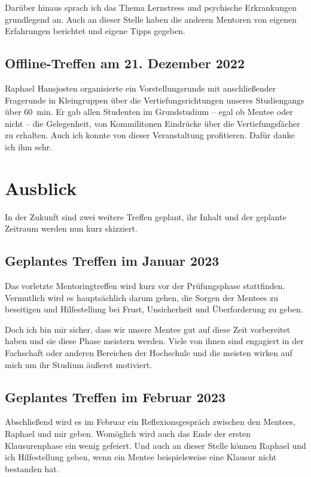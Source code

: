 \documentclass[
    paper=a4,
    div=calc,
    numbers=noendperiod,
]{scrartcl}
\begin{document}
        Darüber hinaus sprach ich das Thema Lernstress und psychische Erkrankungen grundlegend an. Auch an dieser Stelle haben die anderen Mentoren von eigenen Erfahrungen berichtet und eigene Tipps gegeben.

    \subsection{Offline-Treffen am 21. Dezember 2022}
        Raphael Hansjosten organisierte ein Vorstellungsrunde mit anschließender Fragerunde in Kleingruppen über die Vertiefungsrichtungen unseres Studiengangs über \SI{60}{min}. Er gab allen Studenten im Grundstudium -- egal ob Mentee oder nicht -- die Gelegenheit, von Kommilitonen Eindrücke über die Vertiefungsfächer zu erhalten. Auch ich konnte von dieser Veranstaltung profitieren. Dafür danke ich ihm sehr.

\section{Ausblick}
    In der Zukunft sind zwei weitere Treffen geplant, ihr Inhalt und der geplante Zeitraum werden nun kurz skizziert.

    \subsection{Geplantes Treffen im Januar 2023}
        Das vorletzte Mentoringtreffen wird kurz vor der Prüfungsphase stattfinden. Vermutlich wird es hauptsächlich darum gehen, die Sorgen der Mentees zu beseitigen und Hilfestellung bei Frust, Unsicherheit und Überforderung zu geben. 
        
        Doch ich bin mir sicher, dass wir unsere Mentee gut auf diese Zeit vorbereitet haben und sie diese Phase meistern werden. Viele von ihnen sind engagiert in der Fachschaft oder anderen Bereichen der Hochschule und die meisten wirken auf mich um ihr Studium äußerst motiviert.

    \subsection{Geplantes Treffen im Februar 2023}
        Abschließend wird es im Februar ein Reflexionsgespräch zwischen den Mentees, Raphael und mir geben. Womöglich wird auch das Ende der ersten Klausurenphase ein wenig gefeiert. Und auch an dieser Stelle können Raphael und ich Hilfestellung geben, wenn ein Mentee beispielsweise eine Klausur nicht bestanden hat. 
        
\end{document}
